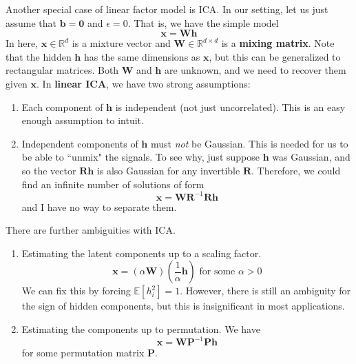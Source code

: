 \documentclass{article}
\begin{document}
    Another special case of linear factor model is ICA. In our setting, let us just assume that $\mathbf{b} = \mathbf{0}$ and $\epsilon = 0$. That is, we have the simple model 
    \[\mathbf{x} = \mathbf{W} \mathbf{h}\] 
    In here, $\mathbf{x} \in \mathbb{R}^d$ is a mixture vector and $\mathbf{W} \in \mathbb{R}^{d \times d}$ is a \textbf{mixing matrix}. Note that the hidden $\mathbf{h}$ has the same dimensions as $\mathbf{x}$, but this can be generalized to rectangular matrices. Both $\mathbf{W}$ and $\mathbf{h}$ are unknown, and we need to recover them given $\mathbf{x}$. In \textbf{linear ICA}, we have two strong assumptions: 
    \begin{enumerate} 
        \item Each component of $\mathbf{h}$ is independent (not just uncorrelated). This is an easy enough assumption to intuit.  
        \item Independent components of $\mathbf{h}$ must \textit{not} be Gaussian. This is needed for us to be able to ``unmix" the signals. To see why, just suppose $\mathbf{h}$ was Gaussian, and so the vector $\mathbf{R} \mathbf{h}$ is also Gaussian for any invertible $\mathbf{R}$. Therefore, we could find an infinite number of solutions of form 
        \[\mathbf{x} = \mathbf{W} \mathbf{R}^{-1} \mathbf{R} \mathbf{h}\]
        and I have no way to separate them. 
    \end{enumerate}

    There are further ambiguities with ICA. 
    \begin{enumerate}
        \item Estimating the latent components up to a scaling factor. 
            \[\mathbf{x} = (\alpha \mathbf{W}) (\frac{1}{\alpha} \mathbf{h}) \text{ for some } \alpha > 0\]
            We can fix this by forcing $\mathbb{E}[h_i^2] = 1$. However, there is still an ambiguity for the sign of hidden components, but this is insignificant in most applications. 

        \item Estimating the components up to permutation. We have 
            \[\mathbf{x} = \mathbf{W} \mathbf{P}^{-1} \mathbf{P} \mathbf{h}\] 
            for some permutation matrix $\mathbf{P}$. 
    \end{enumerate}
\end{document}
